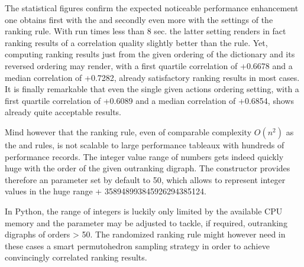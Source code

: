 \documentclass[a4paper,12pt,english]{sphinxhowto}
\begin{document}
\sphinxAtStartPar
The statistical figures confirm the expected noticeable performance enhancement one obtains first with the  and secondly even more with the  settings of the  ranking rule. With run times less than 8 sec. the latter setting renders in fact ranking results of a correlation quality slightly better than the  rule. Yet, computing ranking results just from the given ordering of the  dictionary and its reversed ordering may render, with a first quartile correlation of +0.6678 and a median correlation of +0.7282, already satisfactory ranking results in most cases. It is finally remarkable that even the single given actions ordering setting, with a first quartile correlation of +0.6089 and a median correlation of +0.6854, shows already quite acceptable results.

\sphinxAtStartPar
Mind however that the  ranking rule, even of comparable complexity \(O(n^2)\) as the  and  rules, is not scalable to large performance tableaux with hundreds of performance records. The integer value range of  numbers gets indeed quickly huge with the order of the given outranking digraph. The  constructor provides therefore an  parameter set by default to 50, which allows to represent integer values in the huge range +\sphinxhyphen{} 358948993845926294385124.

\begin{sphinxVerbatim}[commandchars=\\\{\},numbers=left,firstnumber=1,stepnumber=1]
  \PYG{p}{[}    \PYG{p}{]}
  
\end{sphinxVerbatim}

\sphinxAtStartPar
In Python, the range of integers is luckily only limited by the available CPU memory and the  parameter may be adjusted to tackle, if required, outranking digraphs of orders \textgreater{} 50. The randomized  ranking rule might however need in these cases a smart permutohedron sampling strategy in order to achieve convincingly correlated ranking results.
\end{document}
